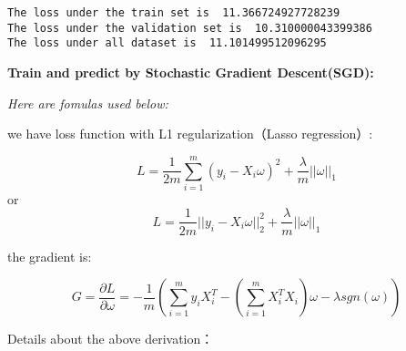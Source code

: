 \documentclass[11pt,a3paper]{article}
\begin{document}
    \begin{Verbatim}[commandchars=\\\{\}]
The loss under the train set is  11.366724927728239
The loss under the validation set is  10.310000043399386
The loss under all dataset is  11.101499512096295

    \end{Verbatim}

    \textbf{Train and predict by Stochastic Gradient Descent(SGD):}

    {\emph{Here are fomulas used below:}}

    {we have loss function with L1 regularization（Lasso regression）}:

    \[L=\frac 1 {2m} \sum_{i=1}^m{(y_i-X_i\omega)^2}+\frac {\lambda} m ||\omega||_1\]
or
\[L=\frac 1 {2m} ||y_i-X_i\omega||^2_2+\frac {\lambda} m ||\omega||_1\]

    {the gradient is}:

    \[G=\frac {\partial L} {\partial \omega}=-\frac 1 m (\sum_{i=1}^m{y_i X_i^T} -(\sum_{i=1}^m {X_i^T X_i})\omega-\lambda sgn(\omega))\]

    {Details about the above derivation：}
\end{document}
